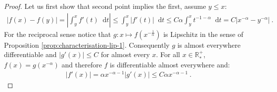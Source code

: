 \documentclass[11pt,a4paper]{article}
\newcommand{\RRP}{\mathbb{R}^+_*}
\newcommand{\dd}{\mathop{}\!\mathrm{d}}
\begin{document}
\begin{proof}
    Let us first show that second point implies the first, assume $y \leq x$:
    \begin{align*}
        |f(x) - f(y)| = \left|\int_y^x f'(t) \dd t\right| \leq \int_y^x |f'(t)| \dd t \leq C\alpha \int_y^x t^{-1-\alpha} \dd t = C|x^{-\alpha} - y^{-\alpha}|\ .
    \end{align*}
    For the reciprocal sense notice that $g : x \mapsto f\left(x^{-\frac{1}{\alpha}} \right)$ is Lipschitz in the sense of Proposition \ref{prop:characterisation-lip-1}. Consequently $g$ is almost everywhere differentiable and $|g'(x)| \leq C$ for almost every $x$. For all $x \in \RRP$, $f(x) = g\left(x^{-\alpha} \right)$ and therefore $f$ is differentiable almost everywhere and:
    \begin{align*}
        |f'(x)| = \alpha x^{-\alpha - 1}|g'(x)| \leq C\alpha x^{-\alpha-1}\ .
    \end{align*}
\end{proof}
\end{document}

